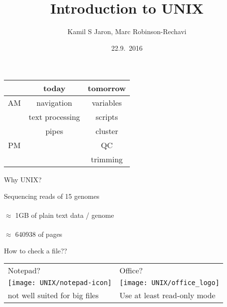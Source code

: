 \documentclass[xcolor=dvipsnames]{beamer}
\title[ ]{Introduction to UNIX}
\author{Kamil S Jaron, Marc Robinson-Rechavi}
\date{22.9.~2016}
\begin{document}
\Large
\begin{frame}
	\titlepage
\end{frame}

\begin{frame}
	\huge
	\begin{center}
		\begin{tabular}{c | c | c}
		 & today & tomorrow \\
		 \hline
		AM & navigation & variables \\
		 & text processing & scripts \\
		 & pipes & cluster \\
		 \hline
		 PM &  & QC \\
		 & & trimming \\
		\end{tabular}			
	\end{center}
\end{frame}

\begin{frame}
	\Huge
	\begin{center}
		Why UNIX?	
	\end{center}
\end{frame}

\begin{frame}
	\huge
	\begin{center}
	Sequencing reads of 15 genomes \\
	~\\
	$\approx$ 1GB of plain text data / genome \\
	~\\
	$\approx$ 640938 of pages
	\end{center}
\end{frame}

\begin{frame}
	\begin{center}
	\huge
	How to check a file?? \\
	\vspace{1cm}
	
	\Large
	\begin{tabular}{C{0.4\textwidth}C{0.4\textwidth}}
	Notepad? & Office? \\
	\texttt{[image: UNIX/notepad-icon]} & \texttt{[image: UNIX/office\_logo]} \\
	\small not well suited for big files & \small Use at least read-only mode\\
	\end{tabular}
	\end{center}
\end{frame}
\end{document}

